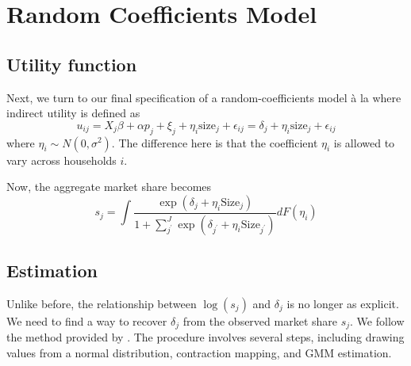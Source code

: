 \documentclass[12pt]{article}[margin=1in]
\begin{document}
\section{Random Coefficients Model}
\subsection{Utility function}
Next, we turn to our final specification of a random-coefficients model \`a la
\citet{berrylevinsohnpakes1995} where indirect utility is defined as
\begin{equation}
    u_{ij}=X_{j}\beta + \alpha p_{j} + \xi_{j} + \eta_i\text{size}_j + \epsilon_{ij} = \delta_j + \eta_i\text{size}_j + \epsilon_{ij}
\end{equation}
where $\eta_i \sim N(0,\sigma^2)$.
The difference here is that the coefficient $\eta_i$ is allowed to vary across
households $i$.

Now, the aggregate market share becomes
\[
    s_j = \int \frac{\exp{(\delta_j + \eta_i \text{Size}_j)}}{1 + \sum_{j^{\prime}}^{J} \exp{(\delta_{j^{\prime}} + \eta_i \text{Size}_{j^{\prime}})}} dF(\eta_i)
\]

\subsection{Estimation}
Unlike before, the relationship between $\log(s_j)$ and $\delta_j$ is no longer
as explicit. We need to find a way to recover $\delta_j$ from the observed
market share $s_j$. We follow the method provided by
\citet{berrylevinsohnpakes1995}. The procedure involves several steps,
including drawing values from a normal distribution, contraction mapping, and
GMM estimation.
\end{document}
